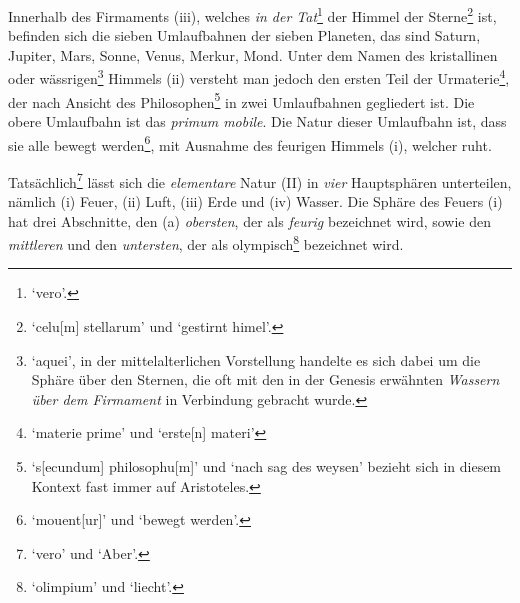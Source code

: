 \documentclass[
]{article}
\begin{document}
Innerhalb des Firmaments (iii), welches \emph{in der Tat}\footnote{`vero'.}
der Himmel der Sterne\footnote{`celu{[}m{]} stellarum' und `gestirnt
  himel'.} ist, befinden sich die sieben Umlaufbahnen der sieben
Planeten, das sind Saturn, Jupiter, Mars, Sonne, Venus, Merkur, Mond.
Unter dem Namen des kristallinen oder wässrigen\footnote{`aquei', in der
  mittelalterlichen Vorstellung handelte es sich dabei um die Sphäre
  über den Sternen, die oft mit den in der Genesis erwähnten
  \emph{Wassern über dem Firmament} in Verbindung gebracht wurde.}
Himmels (ii) versteht man jedoch den ersten Teil der
Urmaterie\footnote{`materie prime' und `erste{[}n{]} materi'}, der nach
Ansicht des Philosophen\footnote{`s{[}ecundum{]} philosophu{[}m{]}' und
  `nach sag des weysen' bezieht sich in diesem Kontext fast immer auf
  Aristoteles.} in zwei Umlaufbahnen gegliedert ist. Die obere
Umlaufbahn ist das \emph{primum mobile}. Die Natur dieser Umlaufbahn
ist, dass sie alle bewegt werden\footnote{`mouent{[}ur{]}' und `bewegt
  werden'.}, mit Ausnahme des feurigen Himmels (i), welcher ruht.

Tatsächlich\footnote{`vero' und `Aber'.} lässt sich die
\emph{elementare} Natur (II) in \emph{vier} Hauptsphären unterteilen,
nämlich (i) Feuer, (ii) Luft, (iii) Erde und (iv) Wasser. Die Sphäre des
Feuers (i) hat drei Abschnitte, den (a) \emph{obersten}, der als
\emph{feurig} bezeichnet wird, sowie den \emph{mittleren} und den
\emph{untersten}, der als olympisch\footnote{`olimpium' und `liecht'.}
bezeichnet wird.
\end{document}

